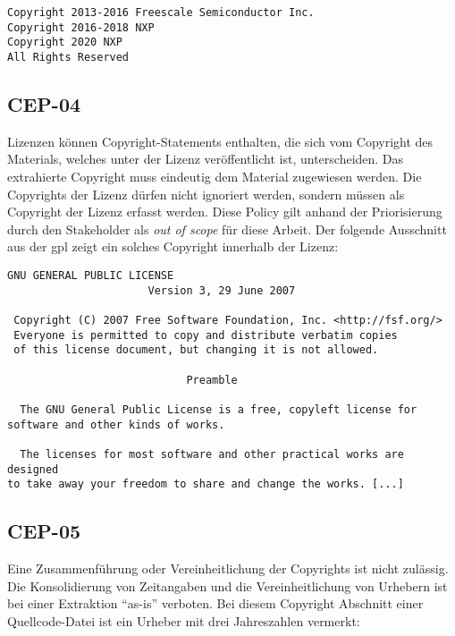 \begin{lstlisting}[keepspaces=true]
Copyright 2013-2016 Freescale Semiconductor Inc.
Copyright 2016-2018 NXP
Copyright 2020 NXP
All Rights Reserved
\end{lstlisting}


\subsection{CEP-04}\label{subsec:cep-04}

Lizenzen können Copyright-Statements enthalten, die sich vom Copyright des Materials, welches unter der Lizenz veröffentlicht ist, unterscheiden.
Das extrahierte Copyright muss eindeutig dem Material zugewiesen werden.
Die Copyrights der Lizenz dürfen nicht ignoriert werden, sondern müssen als Copyright der Lizenz erfasst werden.
Diese Policy gilt anhand der Priorisierung durch den Stakeholder als \textit{out of scope} für diese Arbeit.
Der folgende Ausschnitt aus der \gls{gpl} zeigt ein solches Copyright innerhalb der Lizenz:

\begin{lstlisting}[keepspaces=true]
                    GNU GENERAL PUBLIC LICENSE
                      Version 3, 29 June 2007

 Copyright (C) 2007 Free Software Foundation, Inc. <http://fsf.org/>
 Everyone is permitted to copy and distribute verbatim copies
 of this license document, but changing it is not allowed.

                            Preamble

  The GNU General Public License is a free, copyleft license for
software and other kinds of works.

  The licenses for most software and other practical works are designed
to take away your freedom to share and change the works. [...]
\end{lstlisting}


\subsection{CEP-05}\label{subsec:cep-05}

Eine Zusammenführung oder Vereinheitlichung der Copyrights ist nicht zulässig.
Die Konsolidierung von Zeitangaben und die Vereinheitlichung von Urhebern ist bei einer Extraktion \enquote{as-is} verboten.
Bei diesem Copyright Abschnitt einer Quellcode-Datei ist ein Urheber mit drei Jahreszahlen vermerkt:

